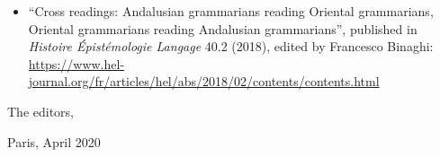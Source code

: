 \begin{refsection}
\begin{itemize}
    \item ``Cross readings: Andalusian grammarians reading Oriental grammarians, Oriental grammarians reading Andalusian grammarians'', published in \emph{Histoire Épistémologie Langage} 40.2 (2018), edited by Francesco Binaghi: \url{https://www.hel-journal.org/fr/articles/hel/abs/2018/02/contents/contents.html}
\end{itemize}

\begin{flushright}
The editors,

Paris, April 2020
\end{flushright}

{\sloppy\printbibliography[heading=subbibliography]}
\end{refsection}

